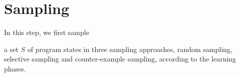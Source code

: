 
\section{Sampling} %
\label{sec:sampling}
In this step, we first sample

a set $S$ of program states in three sampling approaches, random sampling, selective sampling and counter-example sampling, 
according to the learning phases.



